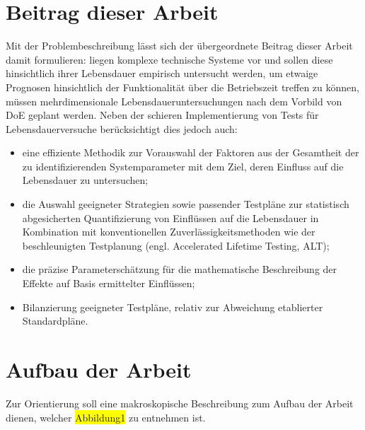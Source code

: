 \section{Beitrag dieser Arbeit}
Mit der Problembeschreibung lässt sich der übergeordnete Beitrag dieser Arbeit damit formulieren: liegen komplexe technische Systeme vor und sollen diese hinsichtlich ihrer Lebensdauer empirisch untersucht werden, um etwaige Prognosen hinsichtlich der Funktionalität über die Betriebszeit treffen zu können, müssen mehrdimensionale Lebensdaueruntersuchungen nach dem Vorbild von DoE geplant werden.
Neben der schieren Implementierung von Tests für Lebensdauerversuche berücksichtigt dies jedoch auch:
\begin{itemize}
    \item eine effiziente Methodik zur Vorauswahl der Faktoren aus der Gesamtheit der zu identifizierenden Systemparameter mit dem Ziel, deren Einfluss auf die Lebensdauer zu untersuchen;
    \item die Auswahl geeigneter Strategien sowie passender Testpläne zur statistisch abgesicherten Quantifizierung von Einflüssen auf die Lebensdauer in Kombination mit konventionellen Zuverlässigkeitsmethoden wie der beschleunigten Testplanung (engl. Accelerated Lifetime Testing, ALT);
    \item die präzise Parameterschätzung für die mathematische Beschreibung der Effekte auf Basis ermittelter Einflüssen;
    \item Bilanzierung geeigneter Testpläne, relativ zur Abweichung etablierter Standardpläne.
\end{itemize}

\section{Aufbau der Arbeit}
Zur Orientierung soll eine makroskopische Beschreibung zum Aufbau der Arbeit dienen, welcher \colorbox{yellow}{Abbildung1} zu entnehmen ist.